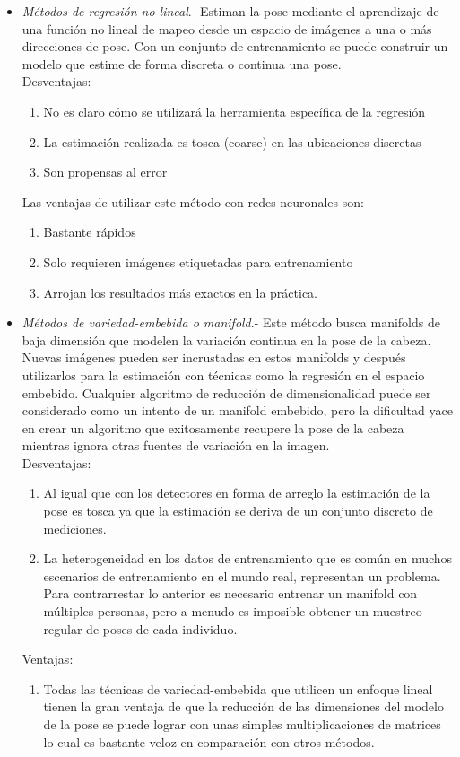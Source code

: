 \begin{itemize}
\item \textit{Métodos de regresión no lineal}.- Estiman la pose mediante el aprendizaje de una función no lineal de mapeo desde un espacio de imágenes a una o más direcciones de pose. Con un conjunto de entrenamiento se puede construir un modelo que estime de forma discreta o continua una pose.
\\Desventajas:
\begin{enumerate}[label=(\alph*)]
	\item No es claro cómo se utilizará la herramienta específica de la regresión
	\item La estimación realizada es tosca (coarse) en las ubicaciones discretas
	\item Son propensas al error
\end{enumerate}

Las ventajas de utilizar este método con redes neuronales son:
\begin{enumerate}[label=(\alph*)]
	\item Bastante rápidos
	\item Solo requieren imágenes etiquetadas para entrenamiento
	\item Arrojan los resultados más exactos en la práctica.
\end{enumerate}

\item \textit{Métodos de variedad-embebida o manifold}.- Este método busca manifolds de baja dimensión que modelen la variación continua en la pose de la cabeza. Nuevas imágenes pueden ser incrustadas en estos manifolds y después utilizarlos para la estimación con técnicas como la regresión en el espacio embebido. Cualquier algoritmo de reducción de dimensionalidad puede ser considerado como un intento de un manifold embebido, pero la dificultad yace en crear un algoritmo que exitosamente recupere la pose de la cabeza mientras ignora otras fuentes de variación en la imagen.
\\Desventajas:
\begin{enumerate}[label=(\alph*)]
	\item Al igual que con los detectores en forma de arreglo la estimación de la pose es tosca ya que la estimación se deriva de un conjunto discreto de mediciones.
	\item La heterogeneidad en los datos de entrenamiento que es común en muchos escenarios de entrenamiento en el mundo real, representan un problema. Para contrarrestar lo anterior es necesario entrenar un manifold con múltiples personas, pero a menudo es imposible obtener un muestreo regular de poses de cada individuo.
\end{enumerate}
Ventajas:
\begin{enumerate}[label=(\alph*)]
	\item Todas las técnicas de variedad-embebida que utilicen un enfoque lineal tienen la gran ventaja de que la reducción de las dimensiones del modelo de la pose se puede lograr con unas simples multiplicaciones de matrices lo cual es bastante veloz en comparación con otros métodos.
\end{enumerate}


\end{itemize}
